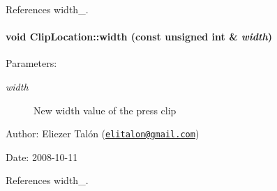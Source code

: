 References width\_\-.\hypertarget{class_clip_location_7dc15a35acc1594dfc1e5f64ca33d3b9}{
\paragraph[width]{\setlength{\rightskip}{0pt plus 5cm}void ClipLocation::width (const unsigned int \& {\em width})}\hfill}
\label{class_clip_location_7dc15a35acc1594dfc1e5f64ca33d3b9}


\begin{Desc}
\item[Parameters:]
\begin{description}
\item[{\em width}]New width value of the press clip\end{description}
\end{Desc}
\begin{Desc}
\item[Author:]Eliezer Talón (\href{mailto:elitalon@gmail.com}{\tt elitalon@gmail.com}) \end{Desc}
\begin{Desc}
\item[Date:]2008-10-11 \end{Desc}


References width\_\-.